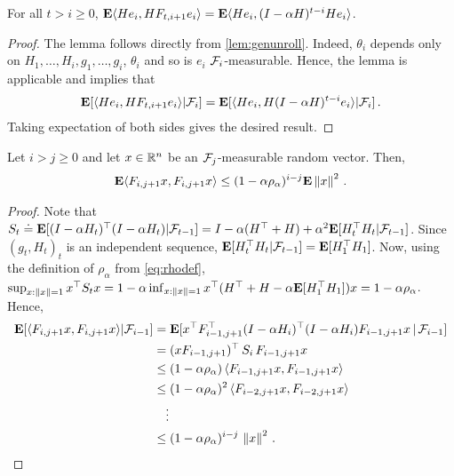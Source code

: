 \begin{lemma}\label{unroll}
For all $t>i\ge 0$, $\mathbf{E} \langle He_i,H F_{t,i+1} e_i\rangle=\mathbf{E}\langle He_i,(I-\alpha H)^{t-i}H e_i\rangle$.
\end{lemma}
\begin{proof}
The lemma follows directly from \cref{lem:genunroll}. Indeed, 
$\theta_i$ depends only on $H_1,\dots,H_{i},g_1,\dots,g_{i}$, $\theta_i$ and so is $e_i$ $\mathcal{F}_i$-measurable.
Hence, the lemma is applicable and implies that
\begin{align*}
\mathbf{E}[ \langle He_i, HF_{t,i+1} e_i\rangle | \mathcal{F}_i ] = 
\mathbf{E}[ \langle He_i, H (I-\alpha H)^{t-i} e_i\rangle | \mathcal{F}_i ]\,.
\end{align*}
Taking expectation of both sides gives the desired result.
\end{proof}

\begin{lemma}\label{innerproduct}
Let $i>j \ge 0$ and let $x\in \mathbb{R}^n$ be an $\mathcal{F}_j$-measurable random vector.
Then, 
\begin{align*}
\mathbf{E}\langle F_{i,j+1}x,F_{i,j+1}x\rangle\leq (1-\alpha \rho_\alpha)^{i-j}\mathbf{E}\left\| x\right\|^2\,.
\end{align*}
\end{lemma}
\begin{proof}
Note that
$S_t\doteq \mathbf{E}[ (I-\alpha H_t)^\top (I-\alpha H_t) | \mathcal{F}_{t-1} ] 
= I - \alpha (H^\top + H) + \alpha^2 \mathbf{E}[ H_t^\top H_t | \mathcal{F}_{t-1} ]$.
Since $(g_t,H_t)_t$ is an independent sequence, $\mathbf{E}[ H_t^\top H_t|\mathcal{F}_{t-1}] = \mathbf{E}[ H_1^\top H_1 ]$.
Now, using the definition of $\rho_\alpha$ from \eqref{eq:rhodef},
$\sup_{x:\left\| x\right\|= 1} x^\top S_t x = 1 - \alpha \inf_{x:\left\| x\right\|=1} x^\top (H^\top + H - \alpha \mathbf{E}[H_1^\top H_1]) x 
= 1-\alpha \rho_\alpha$.
Hence,
\begin{align*}
\mathbf{E}[\langle F_{i,j+1}x,F_{i,j+1}x\rangle|\mathcal{F}_{i-1} ]
&= \mathbf{E}[x^\top F_{i-1,j+1}^\top (I-\alpha H_i)^\top (I-\alpha H_i) F_{i-1,j+1} x\,|\,\mathcal{F}_{i-1}]\\
&=(x F_{i-1,j+1})^\top \, S_i \, F_{i-1,j+1} x\\
&\le (1-\alpha \rho_\alpha) \, \langle F_{i-1,j+1} x, F_{i-1,j+1} x\rangle \\
& \le (1-\alpha \rho_\alpha)^2\, \langle F_{i-2,j+1} x, F_{i-2,j+1} x\rangle \\
& \quad \vdots \\
& \le (1-\alpha \rho_\alpha)^{i-j}\, \left\| x\right\|^2\,.
\end{align*}
\end{proof}

